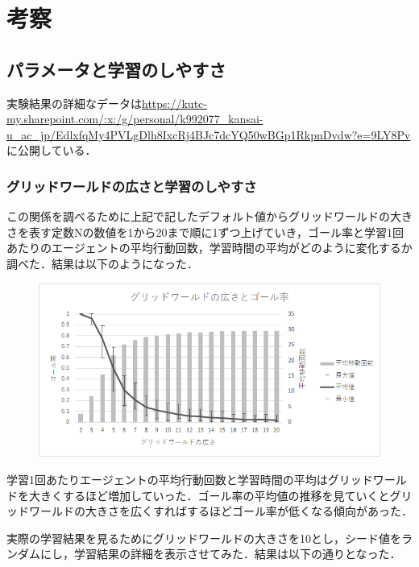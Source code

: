 \documentclass[a4j,11pt]{jarticle}
\begin{document}
\newpage

\section{考察}

\subsection{パラメータと学習のしやすさ}

実験結果の詳細なデータは\url{https://kutc-my.sharepoint.com/:x:/g/personal/k992077_kansai-u_ac_jp/EdlxfqMy4PVLgDlh8IxcRj4BJc7dcYQ50wBGp1RkpnDvdw?e=9LY8Pv}に公開している．

\subsubsection{グリッドワールドの広さと学習のしやすさ}

この関係を調べるために上記で記したデフォルト値からグリッドワールドの大きさを表す定数Nの数値を1から20まで順に1ずつ上げていき，ゴール率と学習1回あたりのエージェントの平均行動回数，学習時間の平均がどのように変化するか調べた．結果は以下のようになった．

\begin{figure}[ht]
  \begin{center}
    \includegraphics[scale=1.5]{img/changeN.png}
  \end{center}
\end{figure}

学習1回あたりエージェントの平均行動回数と学習時間の平均はグリッドワールドを大きくするほど増加していった．ゴール率の平均値の推移を見ていくとグリッドワールドの大きさを広くすればするほどゴール率が低くなる傾向があった．

実際の学習結果を見るためにグリッドワールドの大きさを10とし，シード値をランダムにし，学習結果の詳細を表示させてみた．結果は以下の通りとなった．
\end{document}
